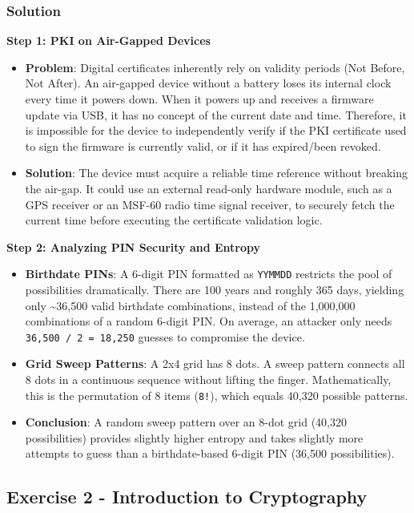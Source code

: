 \documentclass{article}
\begin{document}
\subsubsection*{Solution}
\textbf{Step 1: PKI on Air-Gapped Devices}
\begin{itemize}
    \item \textbf{Problem}: Digital certificates inherently rely on validity periods (Not Before, Not After). An air-gapped device without a battery loses its internal clock every time it powers down. When it powers up and receives a firmware update via USB, it has no concept of the current date and time. Therefore, it is impossible for the device to independently verify if the PKI certificate used to sign the firmware is currently valid, or if it has expired/been revoked.
    \item \textbf{Solution}: The device must acquire a reliable time reference without breaking the air-gap. It could use an external read-only hardware module, such as a GPS receiver or an MSF-60 radio time signal receiver, to securely fetch the current time before executing the certificate validation logic.

\end{itemize}
\textbf{Step 2: Analyzing PIN Security and Entropy}
\begin{itemize}
    \item \textbf{Birthdate PINs}: A 6-digit PIN formatted as \texttt{YYMMDD} restricts the pool of possibilities dramatically. There are 100 years and roughly 365 days, yielding only \textasciitilde{}36,500 valid birthdate combinations, instead of the 1,000,000 combinations of a random 6-digit PIN. On average, an attacker only needs \texttt{36,500 / 2 = 18,250} guesses to compromise the device.
    \item \textbf{Grid Sweep Patterns}: A 2x4 grid has 8 dots. A sweep pattern connects all 8 dots in a continuous sequence without lifting the finger. Mathematically, this is the permutation of 8 items (\texttt{8!}), which equals 40,320 possible patterns.
    \item \textbf{Conclusion}: A random sweep pattern over an 8-dot grid (40,320 possibilities) provides slightly higher entropy and takes slightly more attempts to guess than a birthdate-based 6-digit PIN (36,500 possibilities).
\end{itemize}

\subsection{Exercise 2 - Introduction to Cryptography}
\end{document}
